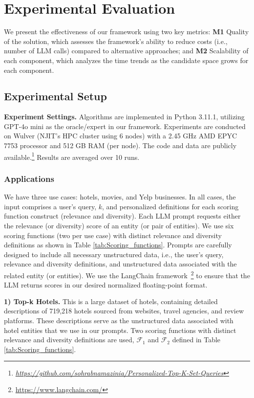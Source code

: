 \section{Experimental Evaluation}\label{sec:exp}
We present the effectiveness of our framework using two key metrics: 
\textbf{M1} Quality of the solution, which assesses the framework's ability to reduce costs (i.e., number of LLM calls) compared to alternative approaches; and 
\textbf{M2} Scalability of each component, which analyzes the time trends as the candidate space grows for each component. 

\subsection{Experimental Setup}\label{sec:exp_setup}

\noindent \textbf{Experiment Settings.} 
Algorithms are implemented in Python 3.11.1, utilizing GPT-4o mini as the oracle/expert in our framework. Experiments are conducted on Wulver (NJIT's HPC cluster using 6 nodes) with a 2.45 GHz AMD EPYC 7753 processor and 512 GB RAM (per node). The code and data are publicly available.\footnote{\it {\it \href{https://github.com/sohrabnamazinia/Personalized-Top-K-Set-Queries}{https://github.com/sohrabnamazinia/Personalized-Top-K-Set-Queries}}} Results are averaged over 10 runs.

\subsubsection{Applications}\label{sec:exp_apps}

We have three use cases: hotels, movies, and Yelp businesses. In all cases, the input comprises a user's query, \( k \), and personalized definitions for each scoring function construct (relevance and diversity). Each LLM prompt requests either the relevance (or diversity) score of an entity (or pair of entities). We use six scoring functions (two per use case) with distinct relevance and diversity definitions as shown in Table \ref{tab:Scoring_functions}.  Prompts are carefully designed to include all necessary unstructured data, i.e., the user's query, relevance and diversity definitions, and unstructured data associated with the related entity (or entities). We use the LangChain framework~\footnote{\url{https://www.langchain.com/}} to ensure that the LLM returns scores in our desired normalized floating-point format. 

\noindent \textbf{1) Top-k Hotels.} 
This is a large dataset \cite{arnab_das_2024} of hotels, containing detailed descriptions of 719,218 hotels sourced from websites, travel agencies, and review platforms. These descriptions serve as the unstructured data associated with hotel entities that we use in our prompts. Two scoring functions with distinct relevance and diversity definitions are used, \(\mathcal{F}_1\) and \(\mathcal{F}_2\) defined in Table \ref{tab:Scoring_functions}.

